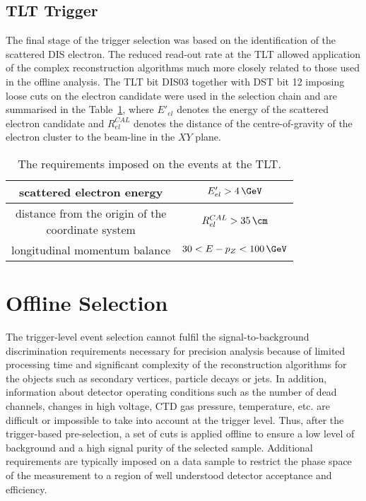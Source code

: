 \subsection{TLT Trigger}
\label{subsec:tltcuts}
The final stage of the trigger selection was based on the identification of the scattered DIS electron. The reduced read-out rate at the TLT allowed application of the complex reconstruction algorithms much more closely related to those used in the offline analysis. The TLT bit \textsf{DIS03} together with DST bit 12 imposing loose cuts on the electron candidate were used in the selection chain and are summarised in the Table~\ref{tab:TLTDSTreq}, where  $E'_{el}$ denotes the energy of the scattered electron candidate and $R_{el}^{CAL}$ denotes the distance of the centre-of-gravity of the electron cluster to the beam-line in the $XY$ plane.
\begin{table}[ht!]
\centering
\begin{tabular}{c|c}
\hline scattered electron energy & $E'_{el}>4\,\GeV$ \T\B\\ 
\hline \pbox{6cm}{distance from the origin of the \\ coordinate system}  & $R_{el}^{CAL}>35\,\cm$ \T\B\\ 
\hline longitudinal momentum balance & $30<E-p_Z<100\,\GeV$\T\B\\
\hline 
\end{tabular} 
\caption{The requirements imposed on the events at the TLT.}
\label{tab:TLTDSTreq}
\end{table}

\section{Offline Selection}
\label{sec:offlineselect}
The trigger-level event selection cannot fulfil the signal-to-background discrimination requirements necessary for precision analysis because of limited processing time and significant complexity of the reconstruction algorithms for the objects such as secondary vertices, particle decays or jets. In addition, information about detector operating conditions such as the number of dead channels, changes in high voltage, CTD gas pressure, temperature, etc. are difficult or impossible to take into account at the trigger level. Thus, after the trigger-based pre-selection, a set of cuts is applied offline to ensure a low level of background and a high signal purity of the selected sample. Additional requirements are typically imposed on a data sample to restrict the phase space of the measurement to a region of well understood detector acceptance and efficiency.

